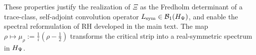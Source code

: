 These properties justify the realization of \( \Xi \) as the Fredholm determinant of a trace-class, self-adjoint convolution operator \( L_{\mathrm{sym}} \in \mathcal{B}_1(H_{\Psi}) \), and enable the spectral reformulation of RH developed in the main text. The map \( \rho \mapsto \mu_\rho := \frac{1}{i}(\rho - \tfrac{1}{2}) \) transforms the critical strip into a real-symmetric spectrum in \( H_{\Psi} \).
